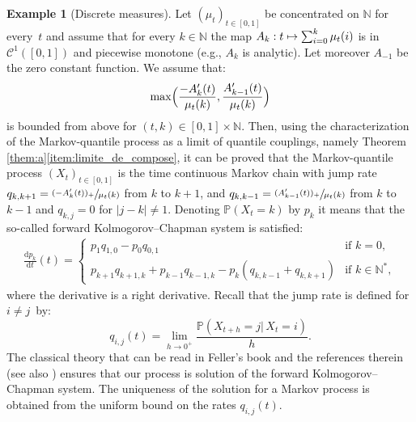 \documentclass[11pt]{article}
\newcommand\mto{\mathchoice{\longmapsto}{\mapsto}{\mapsto}{\mapsto}}
\theoremstyle{plain}
\theoremstyle{definition}
\newtheorem{ex}[them]{Example}
\newcommand{\dd}{\mathrm{d}}
\renewcommand{\P}{\mathbb{P}}
\newcommand{\N}{\mathbb{N}}
\begin{document}
\begin{ex}[Discrete measures]\label{ex:integers}
Let $(\mu_t)_{t\in [0,1]}$ be concentrated on $\N$ for every~$t$ and assume that for every $k\in \N$ the map $A_k:t\mto \sum_{i=0}^k \mu_t(i)$ is in $\mathcal{C}^1([0,1])$ and piecewise monotone (e.g., $A_k$ is analytic). Let moreover $A_{-1}$ be the zero constant function. We assume that:\vspace*{-3pt}\enlargethispage{.3\baselineskip}%
\[\max\Bigl(\frac{-A'_k(t)}{\mu_t(k)},\frac{A'_{k-1}(t)}{\mu_t(k)}\Bigr)\]
is bounded from above for $(t,k)\in[0,1]\times \mathbb{N}$. Then, using the characterization of the Markov-quantile process as a limit of quantile couplings, namely Theorem \ref{them:a}\eqref{item:limite_de_compose}, it can be proved that the Markov-quantile process $(X_t)_{t\in [0,1]}$ is the time continuous Markov chain with jump rate $q_{k,k+1}=\sfrac{(-A'_k(t))_+}{\mu_t(k)}$ from $k$ to $k+1$, and $q_{k,k-1}=\sfrac{(A'_{k-1}(t))_+}{\mu_t(k)}$ from $k$ to $k-1$ and $q_{k,j}=0$ for $|j-k|\neq 1$. Denoting $\P(X_t=k)$ by $p_k$ it means that the so-called forward Kolmogorov--Chapman system is satisfied:\vspace*{-3pt}
\begin{align*}
\frac{\dd p_k}{\dd t}(t)=
\begin{cases}
p_{1}q_{1,0}-p_0q_{0,1}&\text{if }k=0,\\
p_{k+1}q_{k+1,k}+p_{k-1}q_{k-1,k}-p_k(q_{k,k-1}+q_{k,k+1})&\text{if }k\in \N^*,
\end{cases}
\end{align*}
where the derivative is a right derivative. Recall that the jump rate is defined for $i\neq j$~by:\vspace*{-3pt}
\[
q_{i,j}(t)=\lim_{h\to 0^+}\frac{\P(X_{t+h}=j|\,X_t=i)}{h}.
\]
The classical theory that can be read in Feller's book \cite[Chap.\,XVII, \S 9]{Fe_t1} and the references therein (see also \cite{Doe}) ensures that our process is solution of the forward Kolmogorov--Chapman system. The uniqueness of the solution for a Markov process is obtained from the uniform bound on the rates $q_{i,j}(t)$.


\end{ex}
\end{document}
